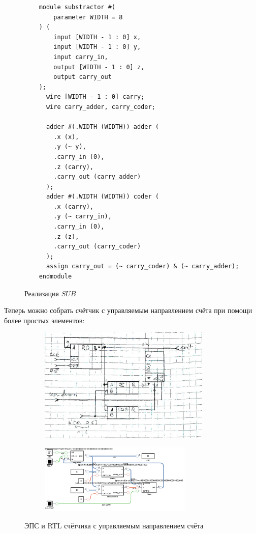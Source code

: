 \documentclass[a4paper]{article}
\begin{document}
  \begin{figure}[H]
   \begin{verbatim}
    module substractor #(
        parameter WIDTH = 8
    ) (
        input [WIDTH - 1 : 0] x,
        input [WIDTH - 1 : 0] y,
        input carry_in,
        output [WIDTH - 1 : 0] z,
        output carry_out
    );
      wire [WIDTH - 1 : 0] carry;
      wire carry_adder, carry_coder;

      adder #(.WIDTH (WIDTH)) adder (
        .x (x),
        .y (~ y),
        .carry_in (0),
        .z (carry),
        .carry_out (carry_adder)
      );
      adder #(.WIDTH (WIDTH)) coder (
        .x (carry),
        .y (~ carry_in),
        .carry_in (0),
        .z (z),
        .carry_out (carry_coder)
      );
      assign carry_out = (~ carry_coder) & (~ carry_adder);
    endmodule
   \end{verbatim} 
   \caption{Реализация $SUB$}
  \end{figure}

  Теперь можно собрать счётчик с управляемым направлением счёта при
  помощи более простых элементов:

  \begin{figure}[H]
    \begin{subfigure}[b]{0.37\textwidth}
    \includegraphics[width=0.9\textwidth]{lab_35.jpg}
    \end{subfigure}
    \hfill
    \begin{subfigure}[b]{0.6\textwidth}
    \includegraphics[width=0.8\textwidth]{lab_36.png}
    \end{subfigure}
    \caption{ЭПС и RTL счётчика с управляемым направлением счёта}
  \end{figure}
\end{document}
